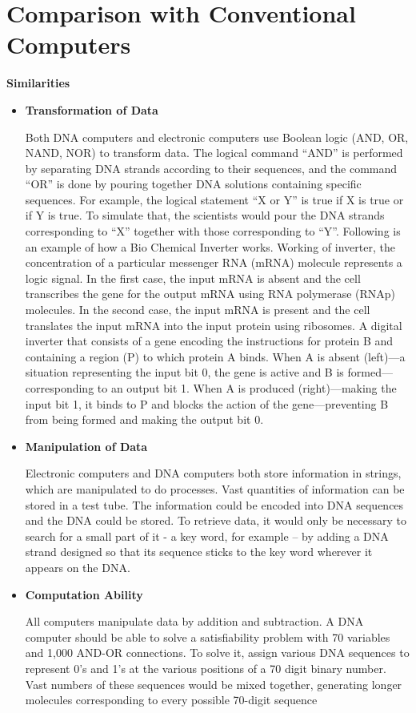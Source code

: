 \section{Comparison with Conventional Computers}

\textbf{Similarities}

  \begin{itemize}
    \item \textbf{Transformation of Data}

        Both DNA computers and electronic computers use Boolean logic (AND, OR, NAND, NOR) to transform data. The logical command ``AND'' is performed by separating DNA strands according to their sequences, and the command ``OR'' is done by pouring together DNA solutions containing specific sequences. For example, the logical statement ``X or Y'' is true if X is true or if Y is true. To simulate that, the scientists would pour the DNA strands corresponding to ``X'' together with those corresponding to ``Y''. Following is an example of how a Bio Chemical Inverter works.
       Working of inverter, the concentration of a particular messenger RNA (mRNA) molecule represents a logic signal. In the first case, the input mRNA is absent and the cell transcribes the gene for the output mRNA using RNA polymerase (RNAp) molecules. In the second case, the input mRNA is present and the cell translates the input mRNA into the input protein using ribosomes.
      A digital inverter that consists of a gene encoding the instructions for protein B and containing a region (P) to which protein A binds. When A is absent (left)—a situation representing the input bit 0, the gene is active and B is formed—corresponding to an output bit 1. When A is produced (right)—making the input bit 1, it binds to P and blocks the action of the gene—preventing B from being formed and making the output bit 0.

      \item \textbf{Manipulation of Data}

      Electronic computers and DNA computers both store information in strings, which are manipulated to do processes. Vast quantities of information can be stored in a test tube. The information could be encoded into DNA sequences and the DNA could be stored. To retrieve data, it would only be necessary to search for a small part of it - a key word, for example – by adding a DNA strand designed so that its sequence sticks to the key word wherever it appears on the DNA.

      \item \textbf{Computation Ability}

      All computers manipulate data by addition and subtraction. A DNA computer should be able to solve a satisfiability problem with 70 variables and 1,000 AND-OR connections. To solve it, assign various DNA sequences to represent 0’s and 1’s at the various positions of a 70 digit binary number. Vast numbers of these sequences would be mixed together, generating longer molecules corresponding to every possible 70-digit sequence 
  \end{itemize}


